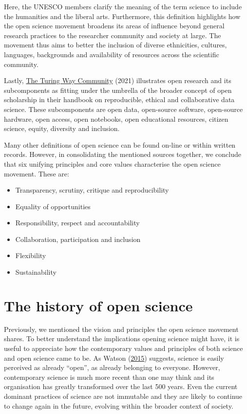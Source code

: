 \documentclass[
]{book}
\begin{document}
Here, the UNESCO members clarify the meaning of the term science to include the humanities and the liberal arts. Furthermore, this definition highlights how the open science movement broadens its areas of influence beyond general research practices to the researcher community and society at large. The movement thus aims to better the inclusion of diverse ethnicities, cultures, languages, backgrounds and availability of resources across the scientific community.

Lastly, \href{https://the-turing-way.netlify.app/welcome}{The Turing Way Community} (2021) illustrates open research and its subcomponents as fitting under the umbrella of the broader concept of open scholarship in their handbook on reproducible, ethical and collaborative data science. These subcomponents are open data, open-source software, open-source hardware, open access, open notebooks, open educational resources, citizen science, equity, diversity and inclusion.

Many other definitions of open science can be found on-line or within written records. However, in consolidating the mentioned sources together, we conclude that six unifying principles and core values characterise the open science movement. These are:

\begin{itemize}
\item
  Transparency, scrutiny, critique and reproducibility
\item
  Equality of opportunities
\item
  Responsibility, respect and accountability
\item
  Collaboration, participation and inclusion
\item
  Flexibility
\item
  Sustainability
\end{itemize}

\hypertarget{the-history-of-open-science}{%
\section{The history of open science}\label{the-history-of-open-science}}

Previously, we mentioned the vision and principles the open science movement shares. To better understand the implications opening science might have, it is useful to appreciate how the contemporary values and principles of both science and open science came to be. As Watson (\href{https://genomebiology.biomedcentral.com/articles/10.1186/s13059-015-0669-2}{2015}) suggests, science is easily perceived as already ``open'', as already belonging to everyone. However, contemporary science is much more recent than one may think and its organisation has greatly transformed over the last 500 years. Even the current dominant practices of science are not immutable and they are likely to continue to change again in the future, evolving within the broader context of society.
\end{document}
